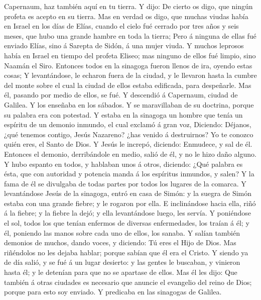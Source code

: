 Capernaum, haz también aquí en tu tierra.  Y dijo: De
cierto os digo, que ningún profeta es acepto en su tierra. 
Mas en verdad os digo, que muchas viudas había en Israel en los días de
Elías, cuando el cielo fué cerrado por tres años y seis meses, que hubo
una grande hambre en toda la tierra;  Pero á ninguna de
ellas fué enviado Elías, sino á Sarepta de Sidón, á una mujer viuda.
 Y muchos leprosos había en Israel en tiempo del profeta
Eliseo; mas ninguno de ellos fué limpio, sino Naamán el Siro.
 Entonces todos en la sinagoga fueron llenos de ira, oyendo
estas cosas;  Y levantándose, le echaron fuera de la
ciudad, y le llevaron hasta la cumbre del monte sobre el cual la ciudad
de ellos estaba edificada, para despeñarle.  Mas él,
pasando por medio de ellos, se fué.  Y descendió á
Capernaum, ciudad de Galilea. Y los enseñaba en los sábados.
 Y se maravillaban de su doctrina, porque su palabra era
con potestad.  Y estaba en la sinagoga un hombre que tenía
un espíritu de un demonio inmundo, el cual exclamó á gran voz,
 Diciendo: Déjanos, ¿qué tenemos contigo, Jesús Nazareno?
¿has venido á destruirnos? Yo te conozco quién eres, el Santo de Dios.
 Y Jesús le increpó, diciendo: Enmudece, y sal de él.
Entonces el demonio, derribándole en medio, salió de él, y no le hizo
daño alguno.  Y hubo espanto en todos, y hablaban unos á
otros, diciendo: ¿Qué palabra es ésta, que con autoridad y potencia
manda á los espíritus inmundos, y salen?  Y la fama de él
se divulgaba de todas partes por todos los lugares de la comarca.
 Y levantándose Jesús de la sinagoga, entró en casa de
Simón: y la suegra de Simón estaba con una grande fiebre; y le rogaron
por ella.  E inclinándose hacia ella, riñó á la fiebre; y
la fiebre la dejó; y ella levantándose luego, les servía. 
Y poniéndose el sol, todos los que tenían enfermos de diversas
enfermedades, los traían á él; y él, poniendo las manos sobre cada uno
de ellos, los sanaba.  Y salían también demonios de muchos,
dando voces, y diciendo: Tú eres el Hijo de Dios. Mas riñéndolos no les
dejaba hablar; porque sabían que él era el Cristo.  Y
siendo ya de día salió, y se fué á un lugar desierto: y las gentes le
buscaban, y vinieron hasta él; y le detenían para que no se apartase de
ellos.  Mas él les dijo: Que también á otras ciudades es
necesario que anuncie el evangelio del reino de Dios; porque para esto
soy enviado.  Y predicaba en las sinagogas de Galilea.

